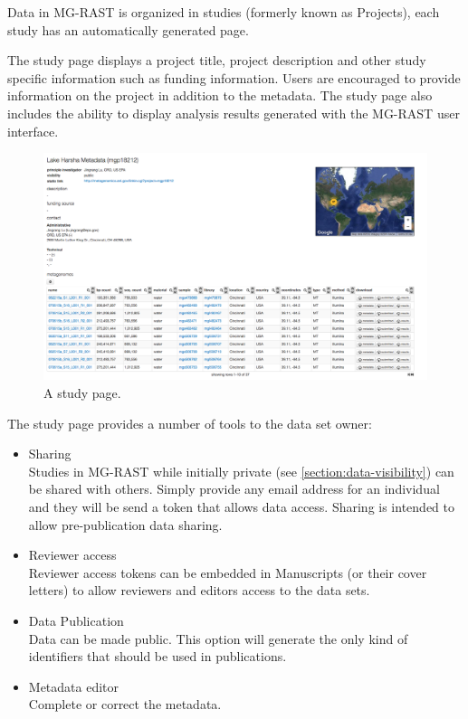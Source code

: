 \documentclass[12pt,fullpage]{report}
\begin{document}
Data in MG-RAST is organized in studies (formerly known as Projects), each study has an automatically generated page.

The study page displays a project title, project description and other study specific information such as funding information. Users are encouraged to provide information on the project in addition to the metadata. The study page also includes the ability to display analysis results generated with the MG-RAST user interface.


\begin{figure}[h]
\begin{center}
\includegraphics[width=7in]{Images/v4-study-page.png}
\end{center}
\caption{
A study page.
}
\label{fig:v4-study}
\end{figure}

The study page provides a number of tools to the data set owner:

\begin{itemize}

\item Sharing\\
Studies in MG-RAST while initially private (see \ref{section:data-visibility}) can be shared with others. Simply provide any email address for an individual and they will be send a token that allows data access.  Sharing is intended to allow pre-publication data sharing.
\item Reviewer access\\
Reviewer access tokens can be embedded in Manuscripts (or their cover letters) to allow reviewers and editors access to the data sets.
\item Data Publication\\
Data can be made public. This option will generate the only kind of identifiers that should be used in publications.
\item Metadata editor\\
Complete or correct the metadata.

\end{itemize}
\end{document}
